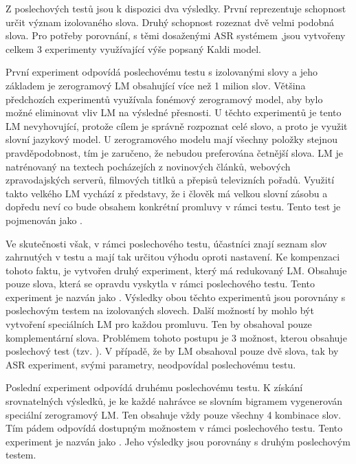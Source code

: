 Z poslechových testů jsou k dispozici dva výsledky. První reprezentuje schopnost určit význam izolovaného slova. Druhý schopnost rozeznat dvě velmi podobná slova. Pro potřeby porovnání, s těmi dosaženými ASR systémem ,jsou vytvořeny celkem $3$ experimenty využívající výše popsaný Kaldi model.

První experiment odpovídá poslechovému testu s izolovanými slovy a jeho základem je zerogramový LM obsahující více než 1 milion slov. Většina předchozích experimentů využívala fonémový zerogramový model, aby bylo možné eliminovat vliv LM na výsledné přesnosti. U těchto experimentů je tento LM nevyhovující, protože cílem je správně rozpoznat celé slovo, a proto je využit slovní jazykový model. U zerogramového modelu mají všechny položky stejnou pravděpodobnost, tím je zaručeno, že nebudou preferována četnější slova. LM je natrénovaný na textech pocházejích z novinových článků, webových zpravodajských serverů, filmových titlků a přepisů televizních pořadů. Využití takto velkého LM vychází z představy, že i člověk má velkou slovní zásobu a dopředu neví co bude obsahem konkrétní promluvy v rámci testu. Tento test je pojmenován jako .

Ve skutečnosti však, v rámci poslechového testu, účastníci znají seznam slov zahrnutých v testu a mají tak určitou výhodu oproti  nastavení. Ke kompenzaci tohoto faktu, je vytvořen druhý experiment, který má redukovaný LM. Obsahuje pouze slova, která se opravdu vyskytla v rámci poslechového testu. Tento experiment je nazván jako . Výsledky obou těchto experimentů jsou porovnány s poslechovým testem na izolovaných slovech. Další možností by mohlo být vytvoření speciálních LM pro každou promluvu. Ten by obsahoval pouze komplementární slova. Problémem tohoto postupu je 3 možnost, kterou obsahuje poslechový test (tzv. ). V případě, že by LM obsahoval pouze dvě slova, tak by ASR experiment, svými parametry, neodpovídal poslechovému testu.

Poslední experiment odpovídá druhému poslechovému testu. K získání srovnatelných výsledků, je ke každé nahrávce se slovním bigramem vygenerován speciální zerogramový LM. Ten obsahuje vždy pouze všechny 4 kombinace slov. Tím pádem odpovídá dostupným možnostem v rámci poslechového testu. Tento experiment je nazván jako . Jeho výsledky jsou porovnány s druhým poslechovým testem.

